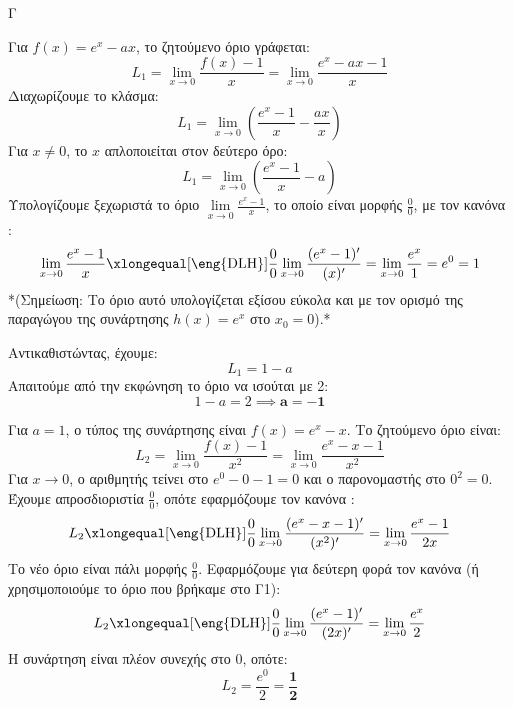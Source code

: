 \begin{thema}{Γ}
\begin{erwthma}
\item Για $f(x) = e^x - ax$, το ζητούμενο όριο γράφεται:
\[ L_1 = \lim_{x \to 0} \frac{f(x) - 1}{x} = \lim_{x \to 0} \frac{e^x - ax - 1}{x} \]
Διαχωρίζουμε το κλάσμα:
\[ L_1 = \lim_{x \to 0} \left( \frac{e^x - 1}{x} - \frac{ax}{x} \right) \]
Για $x \neq 0$, το $x$ απλοποιείται στον δεύτερο όρο:
\[ L_1 = \lim_{x \to 0} \left( \frac{e^x - 1}{x} - a \right) \]
Υπολογίζουμε ξεχωριστά το όριο $\lim\limits_{x \to 0} \frac{e^x - 1}{x}$, το οποίο είναι μορφής $\frac{0}{0}$, με τον κανόνα :
\[ \lim_{x \to 0} \frac{e^x - 1}{x} \xlongequal[\text{\eng{DLH}}]{\frac{0}{0}} \lim_{x \to 0} \frac{(e^x - 1)'}{(x)'} = \lim_{x \to 0} \frac{e^x}{1} = e^0 = 1 \]
*(Σημείωση: Το όριο αυτό υπολογίζεται εξίσου εύκολα και με τον ορισμό της παραγώγου της συνάρτησης $h(x)=e^x$ στο $x_0=0$).*

Αντικαθιστώντας, έχουμε:
\[ L_1 = 1 - a \]
Απαιτούμε από την εκφώνηση το όριο να ισούται με 2:
\[ 1 - a = 2 \implies \boldsymbol{a = -1} \]

\item Για $a = 1$, ο τύπος της συνάρτησης είναι $f(x) = e^x - x$.
Το ζητούμενο όριο είναι:
\[ L_2 = \lim_{x \to 0} \frac{f(x) - 1}{x^2} = \lim_{x \to 0} \frac{e^x - x - 1}{x^2} \]
Για $x \to 0$, ο αριθμητής τείνει στο $e^0 - 0 - 1 = 0$ και ο παρονομαστής στο $0^2 = 0$. 
Έχουμε απροσδιοριστία $\frac{0}{0}$, οπότε εφαρμόζουμε τον κανόνα :
\[ L_2 \xlongequal[\text{\eng{DLH}}]{\frac{0}{0}} \lim_{x \to 0} \frac{(e^x - x - 1)'}{(x^2)'} = \lim_{x \to 0} \frac{e^x - 1}{2x} \]
Το νέο όριο είναι πάλι μορφής $\frac{0}{0}$. Εφαρμόζουμε για δεύτερη φορά τον κανόνα  (ή χρησιμοποιούμε το όριο που βρήκαμε στο Γ1):
\[ L_2 \xlongequal[\text{\eng{DLH}}]{\frac{0}{0}} \lim_{x \to 0} \frac{(e^x - 1)'}{(2x)'} = \lim_{x \to 0} \frac{e^x}{2} \]
Η συνάρτηση είναι πλέον συνεχής στο $0$, οπότε:
\[ L_2 = \frac{e^0}{2} = \boldsymbol{\frac{1}{2}} \]


\end{erwthma}
\end{thema}
